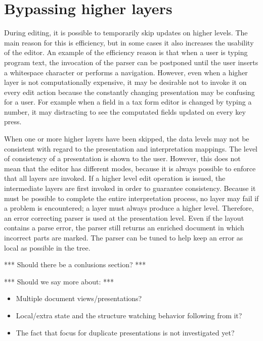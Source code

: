 %																
%																
%																
\section{Bypassing higher layers} \label{sect:bypassingLayers}

During editing, it is possible to temporarily skip updates on higher levels. The main reason for this is efficiency, but in some cases it also increases the usability of the editor. An example of the efficiency reason is that when a user is typing program text, the invocation of the parser can be postponed until the user inserts a whitespace character or performs a navigation. However, even when a higher layer is not computationally expensive, it may be desirable not to invoke it on every edit action because the constantly changing presentation may be confusing for a user. For example when a field in a tax form editor is changed by typing a number, it may distracting to see the computated fields updated on every key press.

When one or more higher layers have been skipped, the data levels may not be consistent with regard to the presentation and interpretation mappings. The level of consistency of a presentation is shown to the user. However, this does not mean that the editor has different modes, because it is always possible to enforce that all layers are invoked. If a higher level edit operation is issued, the intermediate layers are first invoked in order to guarantee consistency. Because it must be possible to complete the entire interpretation process, no layer may fail if a problem is encountered; a layer must always produce a higher level. Therefore, an error correcting parser is used at the presentation level. Even if the layout contains a parse error, the parser still returns an enriched document in which incorrect parts are marked. The parser can be tuned to help keep an error as local as possible in the tree.

 

*** Should there be a conlusions section? ***

*** Should we say more about: ***
\begin{itemize}
\item Multiple document views/presentations?
\item Local/extra state and the structure watching behavior following from it?
\item The fact that focus for duplicate presentations is not investigated yet?
\end{itemize}


